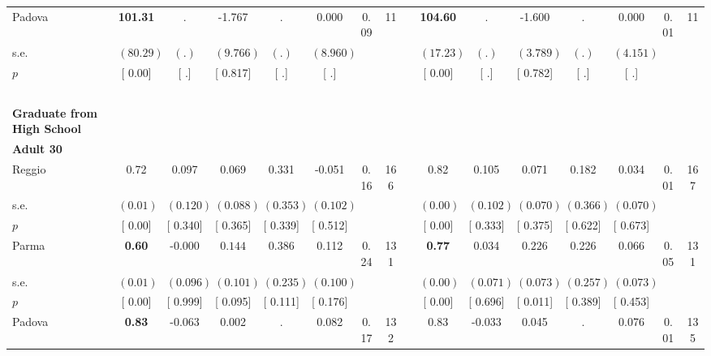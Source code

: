 \begin{longtable}{L{8em} c c c c c c c p{1em} c c c c c c c}
\quad \quad \quad Padova& \textbf{   101.31} &         . &    -1.767 &         . &     0.000 &      0.09 &        11 & & \textbf{   104.60} &         . &    -1.600 &         . &     0.000 &      0.01 &        11  \\*
\quad \quad \quad \quad s.e.& $ (    80.29)$ & $ (        .)$ & $ (    9.766)$ & $ (        .)$ & $ (    8.960)$ & & & & $ (    17.23)$ & $ (        .)$ & $ (    3.789)$ & $ (        .)$ & $ (    4.151)$ & &  \\*
\quad \quad \quad \quad $ p$ & [     0.00] & [        .] & [    0.817] & [        .] & [        .] & & & & [     0.00] & [        .] & [    0.782] & [        .] & [        .] & &  \\[1em]
~\\[1em]
\textbf{Graduate from High School} \\*
\quad \quad \textbf{Adult 30} & & & & & & & & & & & & & & & \\* 
\quad \quad \quad Reggio& 0.72 &     0.097 &     0.069 &     0.331 &    -0.051 &      0.16 &       166 & & 0.82 &     0.105 &     0.071 &     0.182 &     0.034 &      0.01 &       167  \\*
\quad \quad \quad \quad s.e.& $ (     0.01)$ & $ (    0.120)$ & $ (    0.088)$ & $ (    0.353)$ & $ (    0.102)$ & & & & $ (     0.00)$ & $ (    0.102)$ & $ (    0.070)$ & $ (    0.366)$ & $ (    0.070)$ & &  \\*
\quad \quad \quad \quad $ p$ & [     0.00] & [    0.340] & [    0.365] & [    0.339] & [    0.512] & & & & [     0.00] & [    0.333] & [    0.375] & [    0.622] & [    0.673] & &  \\[1em]
\quad \quad \quad Parma& \textbf{     0.60} &    -0.000 & $ \mathbf{    0.144}$ &     0.386 &     0.112 &      0.24 &       131 & & \textbf{     0.77} &     0.034 & $ \mathbf{    0.226}$ &     0.226 &     0.066 &      0.05 &       131  \\*
\quad \quad \quad \quad s.e.& $ (     0.01)$ & $ (    0.096)$ & $ (    0.101)$ & $ (    0.235)$ & $ (    0.100)$ & & & & $ (     0.00)$ & $ (    0.071)$ & $ (    0.073)$ & $ (    0.257)$ & $ (    0.073)$ & &  \\*
\quad \quad \quad \quad $ p$ & [     0.00] & [    0.999] & [    0.095] & [    0.111] & [    0.176] & & & & [     0.00] & [    0.696] & [    0.011] & [    0.389] & [    0.453] & &  \\[1em]
\quad \quad \quad Padova& \textbf{     0.83} &    -0.063 &     0.002 &         . &     0.082 &      0.17 &       132 & & 0.83 &    -0.033 &     0.045 &         . &     0.076 &      0.01 &       135  \\*

\end{longtable}
